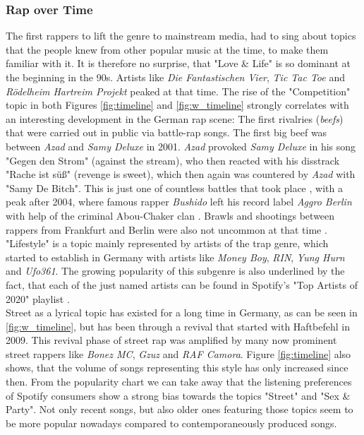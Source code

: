 \documentclass[conference]{IEEEtran}
\begin{document}
\subsubsection{Rap over Time} \label{discussion_timeline}
The first rappers to lift the genre to mainstream media, had to sing about topics that the people knew from other popular music at the time, to make them familiar with it. It is therefore no surprise, that "Love \& Life" is so dominant at the beginning in the 90s. Artists like \textit{Die Fantastischen Vier}, \textit{Tic Tac Toe} and \textit{R\"odelheim Hartreim Projekt} peaked at that time.
The rise of the "Competition" topic in both Figures \ref{fig:timeline} and \ref{fig:w_timeline} strongly correlates with an interesting development in the German rap scene: The first rivalries (\textit{beefs}) that were carried out in public via battle-rap songs. The first big beef was between \textit{Azad} and \textit{Samy Deluxe} in 2001. \textit{Azad} provoked \textit{Samy Deluxe} in his song "Gegen den Strom" (against the stream), who then reacted with his disstrack "Rache ist s\"u\ss" (revenge is sweet), which then again was countered by \textit{Azad} with "Samy De Bitch". This is just one of countless battles that took place \cite{battles}, with a peak after 2004, where famous rapper \textit{Bushido} left his record label \textit{Aggro Berlin} with help of the criminal Abou-Chaker clan \cite{abou-chaker}. Brawls and shootings between rappers from Frankfurt and Berlin were also not uncommon at that time \cite{schlaegerei}.\\
"Lifestyle" is a topic mainly represented by artists of the trap genre, which started to establish in Germany with artists like \textit{Money Boy}, \textit{RIN}, \textit{Yung Hurn} and \textit{Ufo361}. The growing popularity of this subgenre is also underlined by the fact, that each of the just named artists can be found in Spotify's "Top Artists of 2020" playlist \cite{spotify_2020}.\\
Street as a lyrical topic has existed for a long time in Germany, as can be seen in \ref{fig:w_timeline}, but has been through a revival that started with Haftbefehl in 2009. This revival phase of street rap was amplified by many now prominent street rappers like \textit{Bonez MC}, \textit{Gzuz} and \textit{RAF Camora}\cite{strassenrap}. Figure \ref{fig:timeline} also shows, that the volume of songs representing this style has only increased since then. From the popularity chart we can take away that the listening preferences of Spotify consumers show a strong bias towards the topics "Street" and "Sex \& Party". Not only recent songs, but also older ones featuring those topics seem to be more popular nowadays compared to contemporaneously produced songs.
\end{document}
